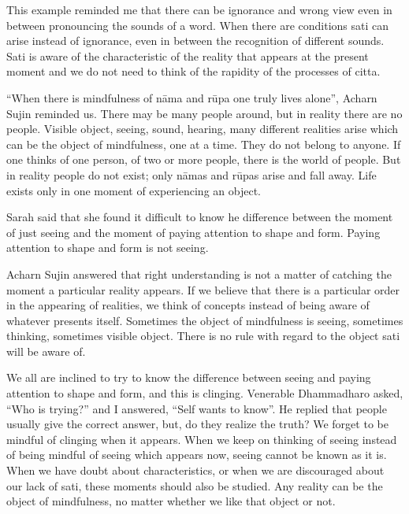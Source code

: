 This example reminded me that there can be ignorance and wrong view even
in between pronouncing the sounds of a word. When there are conditions
sati can arise instead of ignorance, even in between the recognition of
different sounds. Sati is aware of the characteristic of the reality
that appears at the present moment and we do not need to think of the
rapidity of the processes of citta.

``When there is mindfulness of nāma and rūpa one truly lives alone'',
Acharn Sujin reminded us. There may be many people around, but in
reality there are no people. Visible object, seeing, sound, hearing,
many different realities arise which can be the object of mindfulness,
one at a time. They do not belong to anyone. If one thinks of one
person, of two or more people, there is the world of people. But in
reality people do not exist; only nāmas and rūpas arise and fall away.
Life exists only in one moment of experiencing an object.

Sarah said that she found it difficult to know he difference between the
moment of just seeing and the moment of paying attention to shape and
form. Paying attention to shape and form is not seeing.

Acharn Sujin answered that right understanding is not a matter of
catching the moment a particular reality appears. If we believe that
there is a particular order in the appearing of realities, we think of
concepts instead of being aware of whatever presents itself. Sometimes
the object of mindfulness is seeing, sometimes thinking, sometimes
visible object. There is no rule with regard to the object sati will be
aware of.

We all are inclined to try to know the difference between seeing and
paying attention to shape and form, and this is clinging. Venerable
Dhammadharo asked, ``Who is trying?'' and I answered, ``Self wants to
know''. He replied that people usually give the correct answer, but, do
they realize the truth? We forget to be mindful of clinging when it
appears. When we keep on thinking of seeing instead of being mindful of
seeing which appears now, seeing cannot be known as it is. When we have
doubt about characteristics, or when we are discouraged about our lack
of sati, these moments should also be studied. Any reality can be the
object of mindfulness, no matter whether we like that object or not.


\chapter[Rebirth]{}
